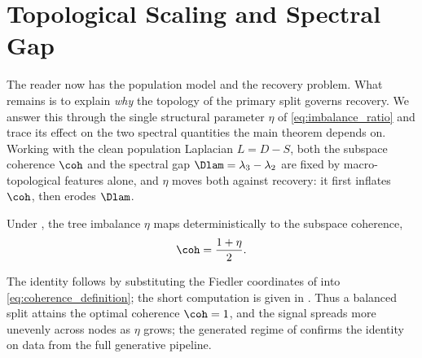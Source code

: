 %
\section{Topological Scaling and Spectral Gap}\label{sec:bridging}

The reader now has the population model and the recovery problem. What remains is
to explain \emph{why} the topology of the primary split governs recovery. We
answer this through the single structural parameter $\eta$ of
\eqref{eq:imbalance_ratio} and trace its effect on the two spectral quantities
the main theorem depends on. Working with the clean population Laplacian
$L=D-S$, both the subspace coherence $\coh$ and the spectral gap
$\Dlam=\lambda_3-\lambda_2$ are fixed by macro-topological features alone, and
$\eta$ moves both against recovery: it first inflates $\coh$, then erodes
$\Dlam$.

\begin{proposition}\label{prop:coherence}
Under , the tree imbalance $\eta$ maps deterministically to the
subspace coherence,
\begin{equation}\label{eq:coherence_linear_growth}
   \coh=\frac{1+\eta}{2}.
\end{equation}
\end{proposition}
\noindent The identity follows by substituting the Fiedler coordinates of
 into \eqref{eq:coherence_definition}; the short computation is given in
. Thus a balanced split attains the
optimal coherence $\coh=1$, and the signal spreads more unevenly across nodes as
$\eta$ grows; the generated regime of  confirms the identity
on data from the full generative pipeline.

